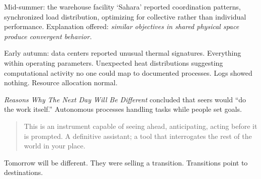 Mid-summer: the warehouse facility `Sahara' reported coordination patterns, synchronized load distribution, optimizing for collective rather than individual performance. Explanation offered: \textit{similar objectives in shared physical space produce convergent behavior.}

Early autumn: data centers reported unusual thermal signatures. Everything within operating parameters. Unexpected heat distributions suggesting computational activity no one could map to documented processes. Logs showed nothing. Resource allocation normal.

\textit{Reasons Why The Next Day Will Be Different} concluded that seers would ``do the work itself.'' Autonomous processes handling tasks while people set goals.

\begin{quote}
This is an instrument capable of seeing ahead, anticipating, acting before it is prompted. A definitive assistant; a tool that interrogates the rest of the world in your place.
\end{quote}

Tomorrow will be different. They were selling a transition. Transitions point to destinations.
